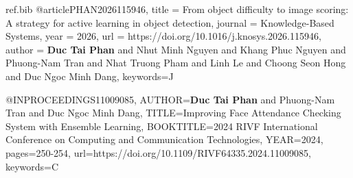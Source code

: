 \begin{filecontents*}{ref.bib}
@article{PHAN2026115946,
title = {From object difficulty to image scoring: A strategy for active learning in object detection},
journal = {Knowledge-Based Systems},
year = {2026},
url = {https://doi.org/10.1016/j.knosys.2026.115946},
author = {\textbf{Duc Tai Phan} and Nhut Minh Nguyen and Khang Phuc Nguyen and Phuong-Nam Tran and Nhat Truong Pham and Linh Le and Choong Seon Hong and Duc Ngoc Minh Dang},
keywords={J}
}

@INPROCEEDINGS{11009085,
    AUTHOR={\textbf{Duc Tai Phan} and Phuong-Nam Tran and Duc Ngoc Minh Dang},
    TITLE={Improving Face Attendance Checking System with Ensemble Learning},
    BOOKTITLE={2024 RIVF International Conference on Computing and Communication Technologies},
    YEAR={2024},
    pages={250-254},
    url={https://doi.org/10.1109/RIVF64335.2024.11009085},
    keywords={C}
}
\end{filecontents*}

%
%
%
%
%
%


